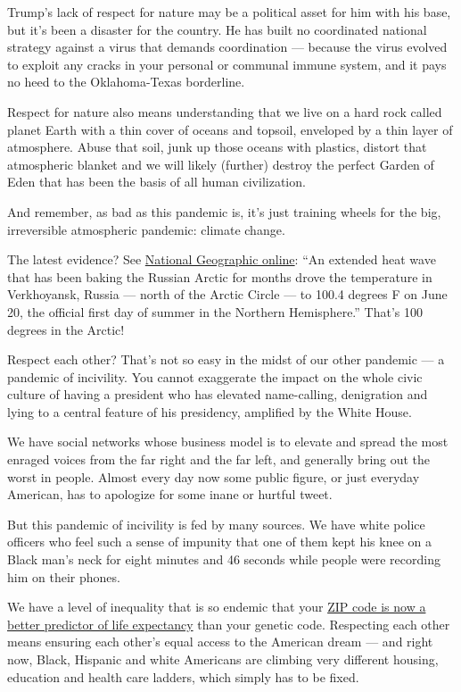Trump's lack of respect for nature may be a political asset for him with
his base, but it's been a disaster for the country. He has built no
coordinated national strategy against a virus that demands coordination
--- because the virus evolved to exploit any cracks in your personal or
communal immune system, and it pays no heed to the Oklahoma-Texas
borderline.

Respect for nature also means understanding that we live on a hard rock
called planet Earth with a thin cover of oceans and topsoil, enveloped
by a thin layer of atmosphere. Abuse that soil, junk up those oceans
with plastics, distort that atmospheric blanket and we will likely
(further) destroy the perfect Garden of Eden that has been the basis of
all human civilization.

And remember, as bad as this pandemic is, it's just training wheels for
the big, irreversible atmospheric pandemic: climate change.

The latest evidence? See
\href{https://www.nationalgeographic.com/science/2020/06/what-100-degree-day-siberia-means-climate-change/}{National
Geographic online}: ``An extended heat wave that has been baking the
Russian Arctic for months drove the temperature in Verkhoyansk, Russia
--- north of the Arctic Circle --- to 100.4 degrees F on June 20, the
official first day of summer in the Northern Hemisphere.'' That's 100
degrees in the Arctic!

Respect each other? That's not so easy in the midst of our other
pandemic --- a pandemic of incivility. You cannot exaggerate the impact
on the whole civic culture of having a president who has elevated
name-calling, denigration and lying to a central feature of his
presidency, amplified by the White House.

We have social networks whose business model is to elevate and spread
the most enraged voices from the far right and the far left, and
generally bring out the worst in people. Almost every day now some
public figure, or just everyday American, has to apologize for some
inane or hurtful tweet.

But this pandemic of incivility is fed by many sources. We have white
police officers who feel such a sense of impunity that one of them kept
his knee on a Black man's neck for eight minutes and 46 seconds while
people were recording him on their phones.

We have a level of inequality that is so endemic that your
\href{https://www.nytimes.com/interactive/2020/05/13/opinion/inequality-cities-life-expectancy.html}{ZIP
code is now a better predictor of life expectancy} than your genetic
code. Respecting each other means ensuring each other's equal access to
the American dream --- and right now, Black, Hispanic and white
Americans are climbing very different housing, education and health care
ladders, which simply has to be fixed.

